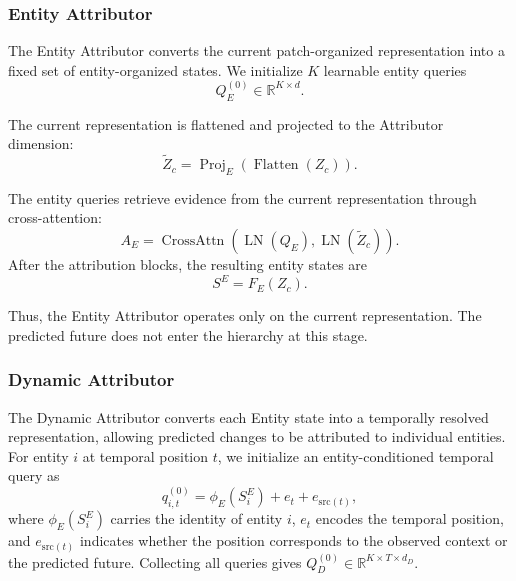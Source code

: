 \documentclass{article}
\begin{document}
\subsubsection{Entity Attributor}

The Entity Attributor converts the current patch-organized representation into a fixed set of entity-organized states. We initialize $K$ learnable entity queries
\begin{equation}
    Q_E^{(0)}
    \in
    \mathbb{R}^{K\times d}.
    \label{eq:app-entity-query}
\end{equation}

The current representation is flattened and projected to the Attributor dimension:
\begin{equation}
    \widetilde Z_c
    =
    \operatorname{Proj}_E
    \left(
    \operatorname{Flatten}(Z_c)
    \right).
\end{equation}

The entity queries retrieve evidence from the current representation through cross-attention:
\begin{equation}
    A_E
    =
    \operatorname{CrossAttn}
    \left(
    \operatorname{LN}(Q_E),
    \operatorname{LN}(\widetilde Z_c)
    \right).
    \label{eq:app-entity-attn}
\end{equation}
After the attribution blocks, the resulting entity states are
\begin{equation}
    S^E = F_E(Z_c).
    \label{eq:app-entity-output}
\end{equation}

Thus, the Entity Attributor operates only on the current representation. The predicted future does not enter the hierarchy at this stage.

\subsubsection{Dynamic Attributor}

The Dynamic Attributor converts each Entity state into a temporally resolved representation, allowing predicted changes to be attributed to individual entities. For entity $i$ at temporal position $t$, we initialize an entity-conditioned temporal query as
\begin{equation}
q_{i,t}^{(0)}
=
\phi_E(S_i^E)
+
e_t
+
e_{\mathrm{src}(t)},
\label{eq:app-dynamic-query}
\end{equation}
where $\phi_E(S_i^E)$ carries the identity of entity $i$, $e_t$ encodes the temporal position, and $e_{\mathrm{src}(t)}$ indicates whether the position corresponds to the observed context or the predicted future. Collecting all queries gives $Q_D^{(0)}\in\mathbb{R}^{K\times T\times d_D}$.
\end{document}
